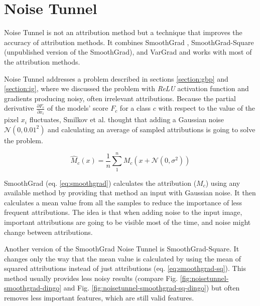 \section{Noise Tunnel}

Noise Tunnel \cite{kokhlikyan2020captum} is not an attribution method but a technique that improves the accuracy of attribution methods. It combines SmoothGrad \cite{smilkov2017smoothgrad}, SmoothGrad-Square (unpublished version of the SmoothGrad), and VarGrad \cite{adebayo2018sanity} and works with most of the attribution methods.

\vspace{\baselineskip}

Noise Tunnel addresses a problem described in sections \ref{section:gbp} and \ref{section:ig}, where we discussed the problem with \textit{ReLU} activation function and gradients producing noisy, often irrelevant attributions. Because the partial derivative $\frac{\partial F_c}{\partial x_i}$ of the models' score $F_c$ for a class $c$ with respect to the value of the pixel $x_i$ fluctuates, Smilkov et al. \cite{smilkov2017smoothgrad} thought that adding a Gaussian noise ${\mathcal {N}}(0, 0.01^2)$ and calculating an average of sampled attributions is going to solve the problem.

\begin{equation}
\hat{M}_{c}(x)=\frac{1}{n} \sum_{1}^{n} M_{c}\left(x+\mathcal{N}\left(0, \sigma^{2}\right)\right)
\label{eq:smoothgrad}
\end{equation}

SmoothGrad (eq. \ref{eq:smoothgrad}) calculates the attribution ($M_c$) using any available method by providing that method an input with Gaussian noise. It then calculates a mean value from all the samples to reduce the importance of less frequent attributions. The idea is that when adding noise to the input image, important attributions are going to be visible most of the time, and noise might change between attributions.

\vspace{\baselineskip}

Another version of the SmoothGrad Noise Tunnel is SmoothGrad-Square. It changes only the way that the mean value is calculated by using the mean of squared attributions instead of just attributions (eq. \ref{eq:smoothgrad-sq}). This method usually provides less noisy results (compare Fig. \ref{fig:noisetunnel-smoothgrad-dingo} and Fig. \ref{fig:noisetunnel-smoothgrad-sq-dingo}) but often removes less important features, which are still valid features.

